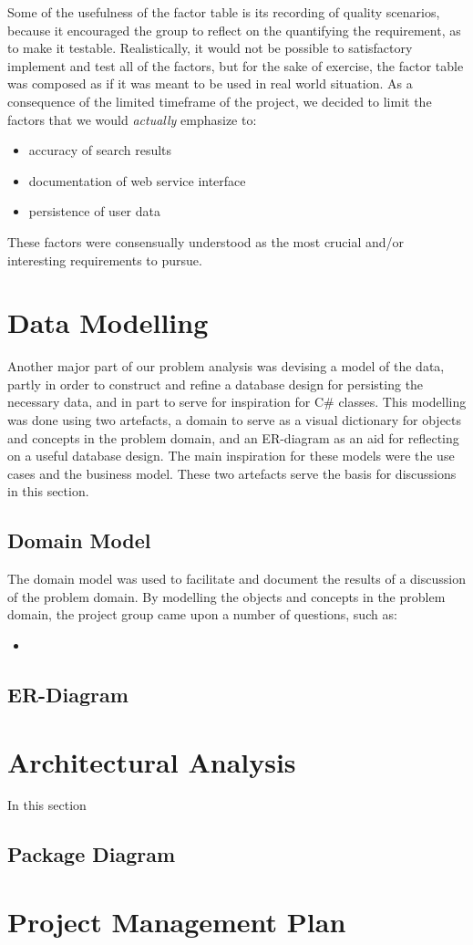 Some of the usefulness of the factor table is its recording of quality scenarios, because it encouraged the group to reflect on the quantifying the requirement, as to make it testable. Realistically, it would not be possible to satisfactory implement and test all of the factors, but for the sake of exercise, the factor table was composed as if it was meant to be used in  real world situation. As a consequence of the limited timeframe of the project, we decided to limit the factors that we would \textit{actually} emphasize to:
\begin{itemize}
\item accuracy of search results
\item documentation of web service interface
\item persistence of user data
\end{itemize}

These factors were consensually understood as the most crucial and/or interesting requirements to pursue.

\section{Data Modelling}
Another major part of our problem analysis was devising a model of the data, partly in order to construct and refine a database design for persisting the necessary data, and in part to serve for inspiration for C\# classes.
This modelling was done using two artefacts, a domain to serve as a visual dictionary for objects and concepts in the problem domain, and an ER-diagram as an aid for reflecting on a useful database design. The main inspiration for these models were the use cases and the business model. These two artefacts serve the basis for discussions in this section.
\subsection{Domain Model}
The domain model was used to facilitate and document the results of a discussion of the problem domain. By modelling the objects and concepts in the problem domain, the project group came upon a number of questions, such as:
\begin{itemize}
\item 
\end{itemize}
\subsection{ER-Diagram}
\section{Architectural Analysis}
In this section
\subsection{Package Diagram}
\section{Project Management Plan}

